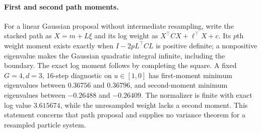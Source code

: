 \paragraph{First and second path moments.}
For a linear Gaussian proposal without intermediate resampling, write the stacked path as $X=m+L\xi$ and its log weight as $X^\top CX+\ell^\top X+c$. Its $p$th weight moment exists exactly when $I-2pL^\top CL$ is positive definite; a nonpositive eigenvalue makes the Gaussian quadratic integral infinite, including the boundary. The exact log moment follows by completing the square. A fixed $G=4,d=3$, 16-step diagnostic on $u\in[1,0]$ has first-moment minimum eigenvalues between $0.36756$ and $0.36796$, and second-moment minimum eigenvalues between $-0.26488$ and $-0.26409$. The normalizer is finite with exact log value $3.615674$, while the unresampled weight lacks a second moment. This statement concerns that path proposal and supplies no variance theorem for a resampled particle system.
